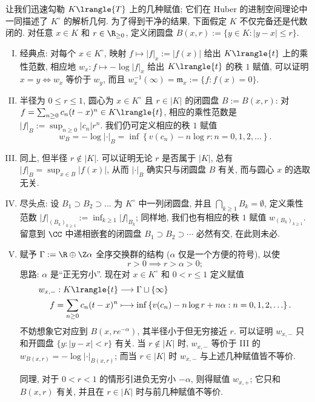 让我们迅速勾勒 $K\lrangle{T}$ 上的几种赋值; 它们在 Huber 的进制空间理论中一同描述了 $K^\circ$ 的解析几何. 为了得到干净的结果, 下面假定 $K$ 不仅完备还是代数闭的. 对任意 $x \in K$ 和 $r \in \R_{\geq 0}$, 定义闭圆盘 $B(x,r) := \{ y \in K: |y-x| \leq r \}$.

\begin{enumerate}[I.]
	\item 经典点: 对每个 $x \in K^\circ$, 映射 $f \mapsto |f|_x := |f(x)|$ 给出 $K\lrangle{t}$ 上的乘性范数, 相应地 $w_x: f \mapsto -\log|f|_x$ 给出 $K\lrangle{t}$ 的秩 $1$ 赋值, 可以证明 $x=y \iff w_x \;\text{等价于}\; w_y$, 而且 $w_x^{-1}(\infty) = \mathfrak{m}_x := \{f: f(x)=0\}$.
	\item 半径为 $0 \leq r \leq 1$, 圆心为 $x \in K^\circ$ 且 $r \in |K|$ 的闭圆盘 $B := B(x,r)$: 对 $f = \sum_{n \geq 0} c_n (t-x)^n \in K\lrangle{t}$, 相应的乘性范数是 $|f|_B := \sup_{n \geq 0} |c_n| r^n$. 我们仍可定义相应的秩 $1$ 赋值
		\[ w_B = -\log|\cdot|_B = \inf\left\{ v(c_n) - n \log r : n=0,1,2,\ldots \right\}. \]
	\item 同上, 但半径 $r \notin |K|$. 可以证明无论 $r$ 是否属于 $|K|$, 总有 $|f|_B = \sup_{x \in B} |f(x)|$, 从而 $|\cdot|_B$ 确实只与闭圆盘 $B$ 有关, 而与圆心 $x$ 的选取无关. 
	\item 尽头点: 设 $B_1 \supset B_2 \supset \ldots$ 为 $K^\circ$ 中一列闭圆盘, 并且 $\bigcap_{k \geq 1} B_k = \emptyset$, 定义乘性范数 $|f|_{(B_k)_{k \geq 1}} := \inf_{k \geq 1} |f|_{B_k}$; 同样地, 我们也有相应的秩 $1$ 赋值 $w_{(B_k)_{k \geq 1}}$. 留意到 $\CC$ 中递相嵌套的闭圆盘 $B_1 \supset B_2 \supset \cdots$ 必然有交, 在此则未必.
	\item 赋予 $\Gamma := \R \oplus \Z\alpha$ 全序交换群的结构 ($\alpha$ 仅是一个方便的符号), 以使
		\[ r > 0 \implies r > \alpha > 0; \]
		思路: $\alpha$ 是``正无穷小''. 现在对 $x \in K^\circ$ 和 $0 < r \leq 1$ 定义赋值
		\begin{align*}
			w_{x,-}: K\lrangle{t} & \longrightarrow \Gamma \sqcup\{\infty\} \\
			f = \sum_{n \geq 0} c_n (t-x)^n & \longmapsto \inf\left\{ v(c_n) - n \log r + n\alpha : n=0,1,2, \ldots \right\}.
		\end{align*}
		不妨想象它对应到 $B(x, re^{-\alpha})$, 其半径小于但无穷接近 $r$. 可以证明 $w_{x,-}$ 只和开圆盘 $\{y: |y-x| < r\}$ 有关. 当 $r \notin |K|$ 时, $w_{x,-}$ 等价于 III 的 $w_{B(x,r)} = -\log|\cdot|_{B(x,r)}$; 而当 $r \in |K|$ 时 $w_{x,-}$ 与上述几种赋值皆不等价.
		
		同理, 对于 $0 < r < 1$ 的情形引进负无穷小 $-\alpha$, 则得赋值 $w_{x,+}$; 它只和 $B(x,r)$ 有关, 并且在 $r \in |K|$ 时与前几种赋值不等价.
\end{enumerate}

